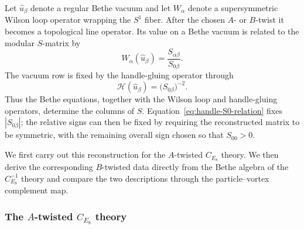 \documentclass[11pt,a4paper]{article}
\numberwithin{equation}{section}
\begin{document}
Let $\widehat u_\beta$ denote a regular Bethe vacuum and let $W_\alpha$ denote a supersymmetric Wilson loop operator wrapping the $S^1$ fiber.  After the chosen $A$- or $B$-twist it becomes a topological line operator.  Its value on a Bethe vacuum is related to the modular $S$-matrix by~\cite{Gang:2021hrd,Gang:2023rei,CreutzigGarnerKim:2024mirror,GangKimParkStubbs:2024Nahm}
\begin{equation}
  W_\alpha(\widehat u_\beta)
  =\frac{S_{\alpha\beta}}{S_{0\beta}}.
  \label{eq:Wilson-S-ratio}
\end{equation}
The vacuum row is fixed by the handle-gluing operator through
\begin{equation}
  \mathcal H(\widehat u_\beta)
  =\bigl(S_{0\beta}\bigr)^{-2}.
  \label{eq:handle-S0-relation}
\end{equation}
Thus the Bethe equations, together with the Wilson loop and handle-gluing operators, determine the columns of $S$.  Equation~\eqref{eq:handle-S0-relation} fixes $|S_{0\beta}|$; the relative signs can then be fixed by requiring the reconstructed matrix to be symmetric, with the remaining overall sign chosen so that $S_{00}>0$.

We first carry out this reconstruction for the $A$-twisted $C_{E_8}$ theory.  We then derive the corresponding $B$-twisted data directly from the Bethe algebra of the $C_{E_8}^{-1}$ theory and compare the two descriptions through the particle--vortex complement map.

\subsubsection{The $A$-twisted $C_{E_8}$ theory}
\label{subsubsec:A-twisted-CE8-S}
\end{document}
